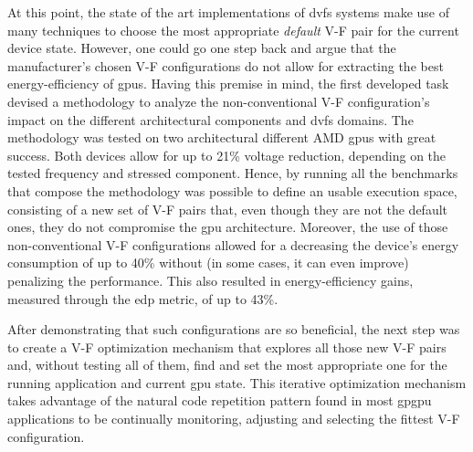 At this point, the state of the art implementations of \acrshort{dvfs} systems make use of many techniques to choose the most appropriate \textit{default} V-F pair for the current device state. However, one could go one step back and argue that the manufacturer's chosen V-F configurations do not allow for extracting the best energy-efficiency of \acrshort{gpu}s. Having this premise in mind, the first developed task devised a methodology to analyze the non-conventional V-F configuration's impact on the different architectural components and \acrshort{dvfs} domains. The methodology was tested on two architectural different AMD \acrshort{gpu}s with great success. Both devices allow for up to 21\% voltage reduction, depending on the tested frequency and stressed component. Hence, by running all the benchmarks that compose the methodology was possible to define an usable execution space, consisting of a new set of V-F pairs that, even though they are not the default ones, they do not compromise the \acrshort{gpu} architecture. Moreover, the use of those non-conventional V-F configurations allowed for a decreasing the device's energy consumption of up to 40\% without (in some cases, it can even improve) penalizing the performance. This also resulted in energy-efficiency gains, measured through the \acrshort{edp} metric, of up to 43\%.

After demonstrating that such configurations are so beneficial, the next step was to create a V-F optimization mechanism that explores all those new V-F pairs and, without testing all of them, find and set the most appropriate one for the running application and current \acrshort{gpu} state. This iterative optimization mechanism takes advantage of the natural code repetition pattern found in most \acrshort{gpgpu} applications to be continually monitoring, adjusting and selecting the fittest V-F configuration.

